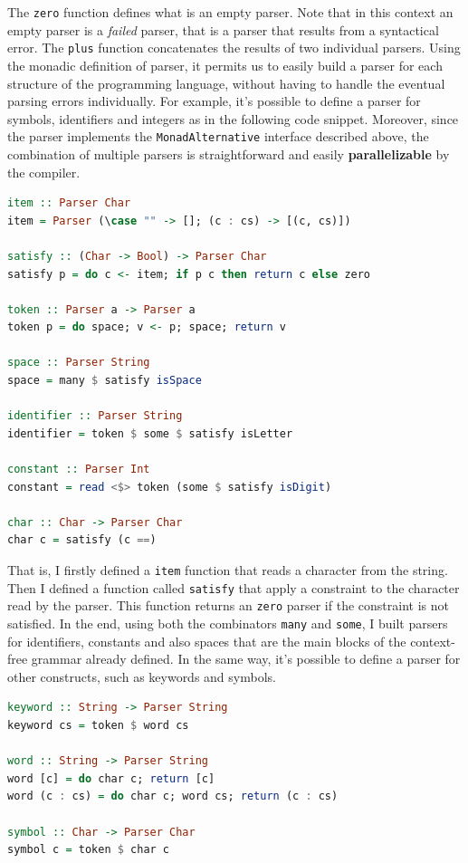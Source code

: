 \documentclass[12pt,a4paper]{article}
\begin{document}
The \texttt{zero} function defines what is an empty parser.
Note that in this context an empty parser is a \textit{failed} parser, that is a parser that results from a syntactical error.
The \texttt{plus} function concatenates the results of two individual parsers.
Using the monadic definition of parser, it permits us to easily build a parser for each structure of the programming language, without having to handle the eventual parsing errors individually.
For example, it's possible to define a parser for symbols, identifiers and integers as in the following code snippet.
Moreover, since the parser implements the \texttt{MonadAlternative} interface described above, the combination of multiple parsers is straightforward and easily \textbf{parallelizable} by the compiler.
\begin{lstlisting}[language=Haskell, style=custom-style]
item :: Parser Char
item = Parser (\case "" -> []; (c : cs) -> [(c, cs)])

satisfy :: (Char -> Bool) -> Parser Char
satisfy p = do c <- item; if p c then return c else zero

token :: Parser a -> Parser a
token p = do space; v <- p; space; return v

space :: Parser String
space = many $ satisfy isSpace

identifier :: Parser String
identifier = token $ some $ satisfy isLetter

constant :: Parser Int
constant = read <$> token (some $ satisfy isDigit)

char :: Char -> Parser Char
char c = satisfy (c ==)
\end{lstlisting}
That is, I firstly defined a \texttt{item} function that reads a character from the string.
Then I defined a function called \texttt{satisfy} that apply a constraint to the character read by the parser.
This function returns an \texttt{zero} parser if the constraint is not satisfied.
In the end, using both the combinators \texttt{many} and \texttt{some}, I built parsers for identifiers, constants and also spaces that are the main blocks of the context-free grammar already defined.
In the same way, it's possible to define a parser for other constructs, such as keywords and symbols.
\begin{lstlisting}[language=Haskell, style=custom-style]
keyword :: String -> Parser String
keyword cs = token $ word cs

word :: String -> Parser String
word [c] = do char c; return [c]
word (c : cs) = do char c; word cs; return (c : cs)

symbol :: Char -> Parser Char
symbol c = token $ char c
\end{lstlisting}
\end{document}
